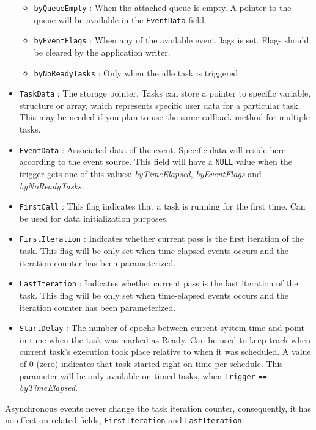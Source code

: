 \begin{itemize}
\begin{itemize}
        \item \lstinline{byQueueEmpty} : When the attached queue is empty. A pointer to the queue will be available in the \lstinline{EventData} field.
        \item \lstinline{byEventFlags} : When any of the available event flags is set. Flags should be cleared by the application writer.
        \item \lstinline{byNoReadyTasks} : Only when the idle task is triggered
    \end{itemize}
    \item \lstinline{TaskData} : The storage pointer. Tasks can store a pointer to specific variable, structure or array, which represents specific user data for a particular task. This may be needed if you plan to use the same callback method for multiple tasks.
    \item \lstinline{EventData} : Associated data of the event. Specific data will reside here according to the event source. This field will have a \lstinline{NULL} value when the trigger gets one of this values:  \textit{byTimeElapsed}, \textit{byEventFlags} and \textit{byNoReadyTasks}.
    \item \lstinline{FirstCall} : This flag indicates that a task is running for the first time. Can be used for data initialization purposes.
    \item \lstinline{FirstIteration} : Indicates whether current pass is the first iteration of the task. This flag will be only set when time-elapsed events occurs and the iteration counter has been parameterized. 
    \item \lstinline{LastIteration} : Indicates whether current pass is the last iteration of the task. This flag will be only set when time-elapsed events occurs and the iteration counter has been parameterized. 
    \item \lstinline{StartDelay} : The number of epochs between current system time and point in time when the task was marked as Ready.
    Can be used to keep track when current task's execution took place relative to when it was scheduled. A value of 0 (zero) indicates that task started right on time per schedule.
    This parameter will be only available on timed tasks, when \lstinline{Trigger} \lstinline{==} \textit{byTimeElapsed}. 
\end{itemize}    

\bigskip

\begin{tcolorbox}
\HandRight Asynchronous events never change the task iteration counter, consequently, it has no effect on related fields, \lstinline{FirstIteration} and \lstinline{LastIteration}.
\end{tcolorbox}
    
